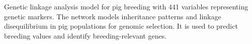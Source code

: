 Genetic linkage analysis model for pig breeding with 441 variables representing genetic markers. The network models inheritance patterns and linkage disequilibrium in pig populations for genomic selection. It is used to predict breeding values and identify breeding-relevant genes.

